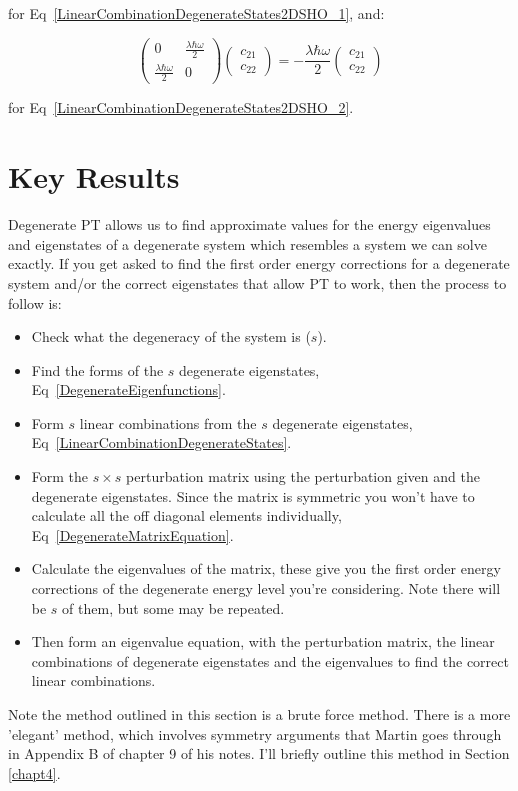 \noindent for Eq~\ref{LinearCombinationDegenerateStates2DSHO_1}, and:

\begin{equation}
    \begin{pmatrix} 0 & \frac{\lambda \hbar \omega}{2} \\ \frac{\lambda \hbar \omega}{2} & 0 \end{pmatrix} \begin{pmatrix} c_{21} \\ c_{22} \end{pmatrix} = - \frac{\lambda \hbar \omega}{2} \begin{pmatrix} c_{21} \\ c_{22} \end{pmatrix}
\end{equation}

\noindent for Eq~\ref{LinearCombinationDegenerateStates2DSHO_2}.

\section{Key Results}
Degenerate PT allows us to find approximate values for the energy eigenvalues and eigenstates of a degenerate system which resembles a system we can solve exactly. If you get asked to find the first order energy corrections for a degenerate system and/or the correct eigenstates that allow PT to work, then the process to follow is:

\begin{itemize}
    \item Check what the degeneracy of the system is ($s$).
    \item Find the forms of the $s$ degenerate eigenstates, Eq~\ref{DegenerateEigenfunctions}.
    \item Form $s$ linear combinations from the $s$ degenerate eigenstates, Eq~\ref{LinearCombinationDegenerateStates}.
    \item Form the $s \times s$ perturbation matrix using the perturbation given and the degenerate eigenstates. Since the matrix is symmetric you won't have to calculate all the off diagonal elements individually, Eq~\ref{DegenerateMatrixEquation}.
    \item Calculate the eigenvalues of the matrix, these give you the first order energy corrections of the degenerate energy level you're considering. Note there will be $s$ of them, but some may be repeated.
    \item Then form an eigenvalue equation, with the perturbation matrix, the linear combinations of degenerate eigenstates and the eigenvalues to find the correct linear combinations.
\end{itemize}

\noindent Note the method outlined in this section is a brute force method. There is a more 'elegant' method, which involves symmetry arguments that Martin goes through in Appendix B of chapter 9 of his notes. I'll briefly outline this method in Section \ref{chapt4}.
